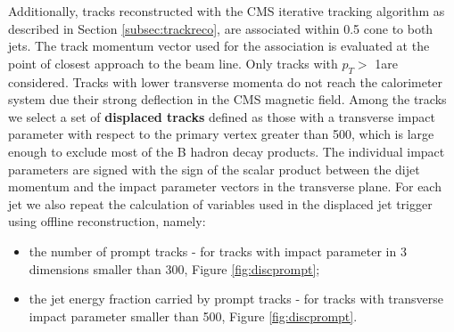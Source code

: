  
Additionally, tracks reconstructed with 
the CMS iterative tracking
algorithm \cite{Giordano:2012hr} as described in Section \ref{subsec:trackreco},
 are associated within 0.5 cone to both jets. The track momentum vector used for 
the association is evaluated at the point of closest approach to the beam line. Only tracks
with $p_T>$ 1\GeV are considered. Tracks with lower transverse momenta
do not reach the calorimeter system due their strong deflection in the CMS magnetic field. Among the tracks we select a set of {\bf displaced tracks} defined as those with
a transverse impact parameter with respect to the primary vertex greater than 500\micron, which is large enough
to exclude most of the B hadron decay products. 
The individual impact parameters are signed with the sign of the scalar product between
 the dijet momentum and the impact parameter vectors in the transverse plane.
For each jet we also repeat the calculation of variables used in the displaced jet trigger
 using offline reconstruction, namely:

\begin{itemize}
\item the number of prompt tracks - for tracks with impact parameter in 3 dimensions smaller than 300\micron, 
Figure \ref{fig:discprompt}; 
\item the jet energy fraction carried by prompt tracks - for tracks with transverse impact parameter smaller 
than 500\micron, Figure \ref{fig:discprompt}.

\end{itemize} 

